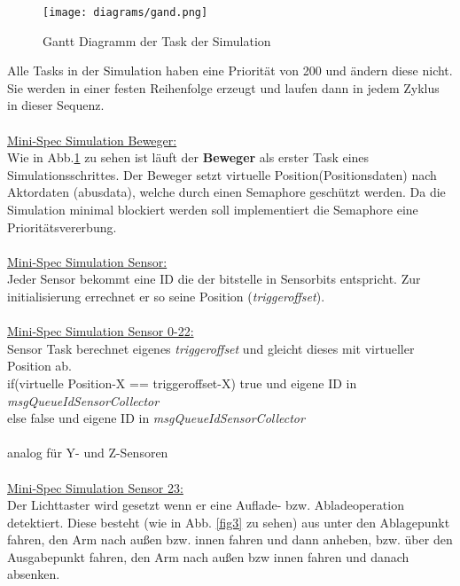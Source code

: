 \begin{figure}[H]
	\centering
  \texttt{[image: diagrams/gand.png]}
	\caption{Gantt Diagramm der Task der Simulation}
	\label{gantt}
\end{figure}

Alle Tasks in der Simulation haben eine Priorität von 200 und ändern diese nicht. Sie werden in einer festen Reihenfolge erzeugt und laufen dann in jedem Zyklus in dieser Sequenz.\\
\\

\underline{Mini-Spec Simulation Beweger:}\\
Wie in Abb.\ref{gantt} zu sehen ist läuft der \textbf{Beweger} als erster Task eines Simulationsschrittes.
Der Beweger setzt virtuelle Position(Positionsdaten) nach Aktordaten (abusdata), welche durch einen Semaphore geschützt werden.  Da die Simulation minimal blockiert werden soll implementiert die Semaphore eine Prioritätsvererbung.\\ \\


\underline{Mini-Spec Simulation Sensor:}\\
Jeder Sensor bekommt eine ID die der bitstelle in Sensorbits entspricht. Zur initialisierung errechnet er so seine Position (\textit{triggeroffset}).\\ \\

\underline{Mini-Spec Simulation Sensor 0-22:}\\
Sensor Task berechnet eigenes \textit{triggeroffset} und gleicht dieses mit virtueller Position ab.\\
if(virtuelle Position-X == triggeroffset-X) true und eigene ID in \textit{msgQueueIdSensorCollector\\}
else false und eigene ID in \textit{msgQueueIdSensorCollector\\} \\
analog für Y- und Z-Sensoren\\ \\

\underline{Mini-Spec Simulation Sensor 23:}\\
Der Lichttaster wird gesetzt wenn er eine Auflade- bzw. Abladeoperation detektiert. Diese besteht (wie in Abb. \ref{fig3} zu sehen) aus unter den Ablagepunkt fahren, den Arm nach außen bzw. innen fahren und dann anheben, bzw. über den Ausgabepunkt fahren, den Arm nach außen bzw innen fahren und danach absenken.\\ \\

